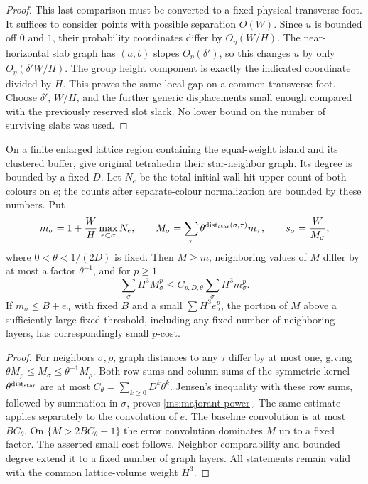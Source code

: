 \begin{proof}
This last comparison must be converted to a fixed physical
transverse foot.  It suffices to consider points with possible
separation $O(W)$.  Since $u$ is bounded off $0$ and $1$, their
probability coordinates differ by $O_\eta(W/H)$.  The near-horizontal
slab graph has $(a,b)$ slopes $O_\eta(\delta')$, so this changes
$u$ by only $O_\eta(\delta'W/H)$.  The group height component is
exactly the indicated coordinate divided by $H$.  This proves the
same local gap on a common transverse foot.  Choose $\delta'$,
$W/H$, and the further generic displacements small enough compared
with the previously reserved slot slack.  No lower bound on the
number of surviving slabs was used.
\end{proof}

\begin{lemma}
\label{ms:majorant}
On a finite enlarged lattice region containing the equal-weight
island and its clustered buffer, give original tetrahedra their
star-neighbor graph.  Its degree is bounded by a fixed $D$.
Let $N_e$ be the total initial wall-hit upper count of both colours on
$e$; the counts after separate-colour normalization are bounded by
these numbers.  Put
\begin{equation}
 m_\sigma=1+\frac WH\max_{e\subset\sigma}N_e,
 \qquad
 M_\sigma=\sum_\tau
       \theta^{\operatorname{dist}_{\rm star}(\sigma,\tau)}m_\tau,
 \qquad
 s_\sigma=\frac W{M_\sigma},
 \label{ms:majorant-def}
\end{equation}
where $0<\theta<1/(2D)$ is fixed.  Then $M\ge m$,
neighboring values of $M$ differ by at most a factor $\theta^{-1}$,
and for $p\ge1$
\begin{equation}
 \sum_\sigma H^3M_\sigma^p
       \le C_{p,D,\theta}\sum_\sigma H^3m_\sigma^p.
 \label{ms:majorant-power}
\end{equation}
If $m_\sigma\le B+e_\sigma$ with fixed $B$ and a small
$\sum H^3e_\sigma^p$, the portion of $M$ above a sufficiently large
fixed threshold, including any fixed number of neighboring layers,
has correspondingly small $p$-cost.
\end{lemma}

\begin{proof}
For neighbors $\sigma,\rho$, graph distances to any $\tau$ differ
by at most one, giving
$\theta M_\rho\le M_\sigma\le\theta^{-1}M_\rho$.
Both row sums and column sums of the symmetric kernel
$\theta^{\operatorname{dist}_{\rm star}}$ are at most
$C_\theta=\sum_{k\ge0}D^k\theta^k$.  Jensen's inequality with
these row sums, followed by summation in $\sigma$, proves
\eqref{ms:majorant-power}.  The same estimate applies separately
to the convolution of $e$.  The baseline convolution is at most
$BC_\theta$.  On $\{M>2BC_\theta+1\}$ the error convolution
dominates $M$ up to a fixed factor.  The asserted small cost follows.
Neighbor comparability and bounded degree extend it to a fixed
number of graph layers.  All statements remain valid with the
common lattice-volume weight $H^3$.
\end{proof}

